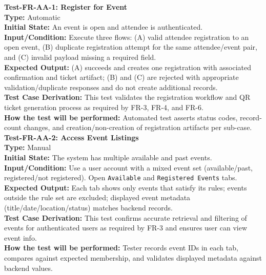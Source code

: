 \documentclass[12pt, titlepage]{article}
\begin{document}
\noindent\textbf{Test-FR-AA-1: Register for Event}\\
\textbf{Type:} Automatic\\
\textbf{Initial State:} An event is open and attendee is authenticated.\\
\textbf{Input/Condition:} Execute three flows: (A) valid attendee registration to an open event, (B) duplicate registration attempt for the same attendee/event pair, and (C) invalid payload missing a required field.\\
\textbf{Expected Output:} (A) succeeds and creates one registration with associated confirmation and ticket artifact; (B) and (C) are rejected with appropriate validation/duplicate responses and do not create additional records.\\
\textbf{Test Case Derivation:} This test validates the registration workflow and QR ticket generation process as required by FR-3, FR-4, and FR-6.\\
\textbf{How the test will be performed:} Automated test asserts status codes, record-count changes, and creation/non-creation of registration artifacts per sub-case.\\[6pt]

\noindent\textbf{Test-FR-AA-2: Access Event Listings}\\
\textbf{Type:} Manual\\
\textbf{Initial State:} The system has multiple available and past events.\\
\textbf{Input/Condition:} Use a user account with a mixed event set (available/past, registered/not registered). Open \texttt{Available} and \texttt{Registered Events} tabs.\\
\textbf{Expected Output:} Each tab shows only events that satisfy its rules; events outside the rule set are excluded; displayed event metadata (title/date/location/status) matches backend records.\\
\textbf{Test Case Derivation:} This test confirms accurate retrieval and filtering of events for authenticated users as required by FR-3 and ensures user can view event info.\\
\textbf{How the test will be performed:} Tester records event IDs in each tab, compares against expected membership, and validates displayed metadata against backend values.\\[6pt]
\end{document}
